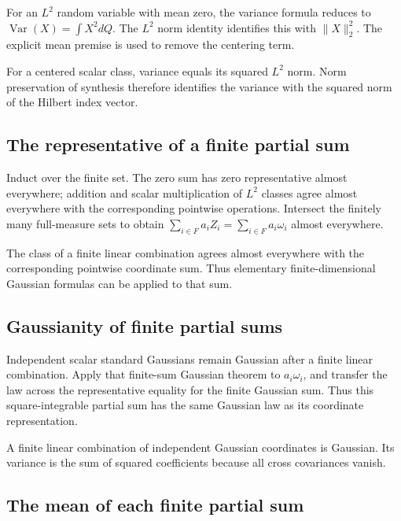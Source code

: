\documentclass[11pt,a4paper]{article}
\begin{document}
For an \(L^2\) random variable with mean zero, the variance formula reduces to \(\operatorname{Var}(X)=\int X^2dQ\). The \(L^2\) norm identity identifies this with \(\|X\|_2^2\). The explicit mean premise is used to remove the centering term.



For a centered scalar class, variance equals its squared \(L^2\) norm. Norm preservation of synthesis therefore identifies the variance with the squared norm of the Hilbert index vector.


\subsection{\texorpdfstring{The representative of a finite partial sum}{The representative of a finite partial sum}}


Induct over the finite set. The zero sum has zero representative almost everywhere; addition and scalar multiplication of \(L^2\) classes agree almost everywhere with the corresponding pointwise operations. Intersect the finitely many full-measure sets to obtain \(\sum_{i\in F}a_iZ_i=\sum_{i\in F}a_i\omega_i\) almost everywhere.



The class of a finite linear combination agrees almost everywhere with the corresponding pointwise coordinate sum. Thus elementary finite-dimensional Gaussian formulas can be applied to that sum.


\subsection{\texorpdfstring{Gaussianity of finite partial sums}{Gaussianity of finite partial sums}}


Independent scalar standard Gaussians remain Gaussian after a finite linear combination. Apply that finite-sum Gaussian theorem to \(a_i\omega_i\), and transfer the law across the representative equality for the finite Gaussian sum. Thus this square-integrable partial sum has the same Gaussian law as its coordinate representation.



A finite linear combination of independent Gaussian coordinates is Gaussian. Its variance is the sum of squared coefficients because all cross covariances vanish.


\subsection{\texorpdfstring{The mean of each finite partial sum}{The mean of each finite partial sum}}
\end{document}
